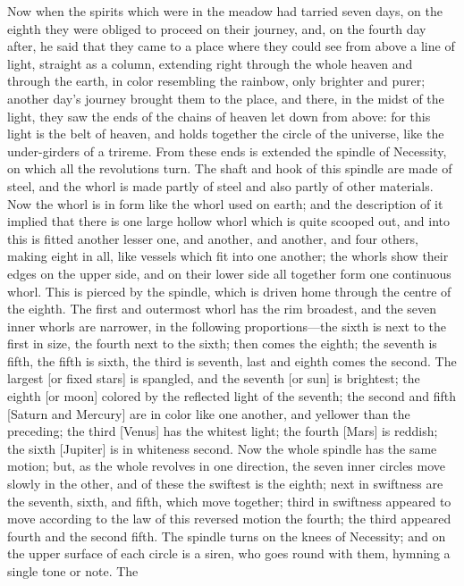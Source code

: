 \documentclass[12pt]{article}
\begin{document}
Now when the spirits which were in the meadow had tarried seven days, on the
eighth they were obliged to proceed on their journey, and, on the fourth day
after, he said that they came to a place where they could see from above a line
of light, straight as a column, extending right through the whole heaven and
through the earth, in color resembling the rainbow, only brighter and purer;
another day's journey brought them to the place, and there, in the midst of the
light, they saw the ends of the chains of heaven let down from above: for this
light is the belt of heaven, and holds together the circle of the universe,
like the under-girders of a trireme. From these ends is extended the spindle of
Necessity, on which all the revolutions turn. The shaft and hook of this
spindle are made of steel, and the whorl is made partly of steel and also
partly of other materials. Now the whorl is in form like the whorl used on
earth; and the description of it implied that there is one large hollow whorl
which is quite scooped out, and into this is fitted another lesser one, and
another, and another, and four others, making eight in all, like vessels which
fit into one another; the whorls show their edges on the upper side, and on
their lower side all together form one continuous whorl. This is pierced by the
spindle, which is driven home through the centre of the eighth. The first and
outermost whorl has the rim broadest, and the seven inner whorls are narrower,
in the following proportions---the sixth is next to the first in size, the
fourth next to the sixth; then comes the eighth; the seventh is fifth, the
fifth is sixth, the third is seventh, last and eighth comes the second. The
largest [or fixed stars] is spangled, and the seventh [or sun] is brightest;
the eighth [or moon] colored by the reflected light of the seventh; the second
and fifth [Saturn and Mercury] are in color like one another, and yellower
than the preceding; the third [Venus] has the whitest light; the fourth [Mars]
is reddish; the sixth [Jupiter] is in whiteness second. Now the whole spindle
has the same motion; but, as the whole revolves in one direction, the seven
inner circles move slowly in the other, and of these the swiftest is the
eighth; next in swiftness are the seventh, sixth, and fifth, which move
together; third in swiftness appeared to move according to the law of this
reversed motion the fourth; the third appeared fourth and the second fifth. The
spindle turns on the knees of Necessity; and on the upper surface of each
circle is a siren, who goes round with them, hymning a single tone or note. The
\end{document}

